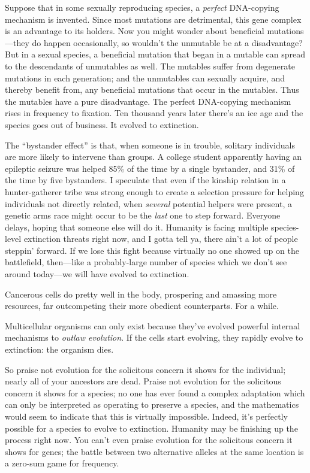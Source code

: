 {
 Suppose that in some sexually reproducing species, a
\textit{perfect} DNA-copying mechanism is invented. Since most
mutations are detrimental, this gene complex is an advantage to its
holders. Now you might wonder about beneficial mutations---they do
happen occasionally, so wouldn't the unmutable be at a
disadvantage? But in a sexual species, a beneficial mutation that began
in a mutable can spread to the descendants of unmutables as well. The
mutables suffer from degenerate mutations in each generation; and the
unmutables can sexually acquire, and thereby benefit from, any
beneficial mutations that occur in the mutables. Thus the mutables have
a pure disadvantage. The perfect DNA-copying mechanism rises in
frequency to fixation. Ten thousand years later there's
an ice age and the species goes out of business. It evolved to
extinction.}

{
 The ``bystander effect'' is
that, when someone is in trouble, solitary individuals are more likely
to intervene than groups. A college student apparently having an
epileptic seizure was helped 85\% of the time by a single bystander,
and 31\% of the time by five bystanders. I speculate that even if the
kinship relation in a hunter-gatherer tribe was strong enough to create
a selection pressure for helping individuals not directly related, when
\textit{several} potential helpers were present, a genetic arms race
might occur to be the \textit{last} one to step forward. Everyone
delays, hoping that someone else will do it. Humanity is facing
multiple species-level extinction threats right now, and I gotta tell
ya, there ain't a lot of people
steppin' forward. If we lose this fight because
virtually no one showed up on the battlefield, then---like a
probably-large number of species which we don't see
around today---we will have evolved to extinction.}

{
 Cancerous cells do pretty well in the body, prospering and
amassing more resources, far outcompeting their more obedient
counterparts. For a while.}

{
 Multicellular organisms can only exist because
they've evolved powerful internal mechanisms to
\textit{outlaw evolution}. If the cells start evolving, they rapidly
evolve to extinction: the organism dies.}

{
 So praise not evolution for the solicitous concern it shows for
the individual; nearly all of your ancestors are dead. Praise not
evolution for the solicitous concern it shows for a species; no one has
ever found a complex adaptation which can only be interpreted as
operating to preserve a species, and the mathematics would seem to
indicate that this is virtually impossible. Indeed,
it's perfectly possible for a species to evolve to
extinction. Humanity may be finishing up the process right now. You
can't even praise evolution for the solicitous concern
it shows for genes; the battle between two alternative alleles at the
same location is a zero-sum game for frequency.}

